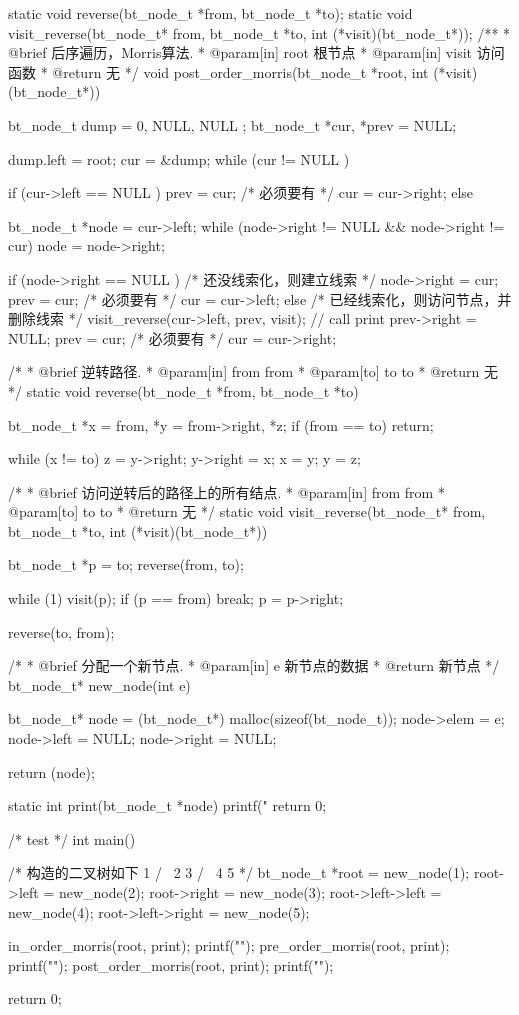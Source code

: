 \begin{Codex}[label=morris_traversal.c]
static void reverse(bt_node_t *from, bt_node_t *to);
static void visit_reverse(bt_node_t* from, bt_node_t *to,
        int (*visit)(bt_node_t*));
/**
 * @brief 后序遍历，Morris算法.
 * @param[in] root 根节点
 * @param[in] visit 访问函数
 * @return 无
 */
void post_order_morris(bt_node_t *root, int (*visit)(bt_node_t*)) {
    bt_node_t dump = { 0, NULL, NULL };
    bt_node_t *cur, *prev = NULL;

    dump.left = root;
    cur = &dump;
    while (cur != NULL ) {
        if (cur->left == NULL ) {
            prev = cur; /* 必须要有 */
            cur = cur->right;
        } else {
            bt_node_t *node = cur->left;
            while (node->right != NULL && node->right != cur)
                node = node->right;

            if (node->right == NULL ) { /* 还没线索化，则建立线索 */
                node->right = cur;
                prev = cur; /* 必须要有 */
                cur = cur->left;
            } else { /* 已经线索化，则访问节点，并删除线索  */
                visit_reverse(cur->left, prev, visit);  // call print
                prev->right = NULL;
                prev = cur; /* 必须要有 */
                cur = cur->right;
            }
        }
    }
}

/*
 * @brief 逆转路径.
 * @param[in] from from
 * @param[to] to to
 * @return 无
 */
static void reverse(bt_node_t *from, bt_node_t *to) {
    bt_node_t *x = from, *y = from->right, *z;
    if (from == to) return;

    while (x != to) {
        z = y->right;
        y->right = x;
        x = y;
        y = z;
    }
}

/*
 * @brief  访问逆转后的路径上的所有结点.
 * @param[in] from from
 * @param[to] to to
 * @return 无
 */
static void visit_reverse(bt_node_t* from, bt_node_t *to,
        int (*visit)(bt_node_t*)) {
    bt_node_t *p = to;
    reverse(from, to);

    while (1) {
        visit(p);
        if (p == from)
            break;
        p = p->right;
    }

    reverse(to, from);
}

/*
 * @brief 分配一个新节点.
 * @param[in] e 新节点的数据
 * @return 新节点
 */
bt_node_t* new_node(int e) {
    bt_node_t* node = (bt_node_t*) malloc(sizeof(bt_node_t));
    node->elem = e;
    node->left = NULL;
    node->right = NULL;

    return (node);
}

static int print(bt_node_t *node) {
    printf(" %
    return 0;
}

/* test */
int main() {
    /* 构造的二叉树如下
       1
     /   \
    2      3
  /  \
4     5
     */
    bt_node_t *root = new_node(1);
    root->left = new_node(2);
    root->right = new_node(3);
    root->left->left = new_node(4);
    root->left->right = new_node(5);

    in_order_morris(root, print);
    printf("\n");
    pre_order_morris(root, print);
    printf("\n");
    post_order_morris(root, print);
    printf("\n");

    return 0;
}
\end{Codex}


